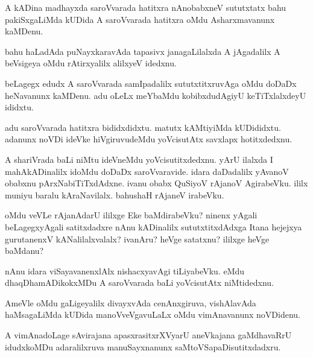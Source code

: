 \begin{mng}
A kADina madhayxda saroVvarada hatitxra nAnobabxneV sututxtatx bahu pakiSxgaLiMda kUDida A saroVvarada hatitxra oMdu Asharxmavanunx kaMDenu.
\end{mng}

\begin{mng}
bahu haLadAda puNayxkaravAda tapasivx janagaLilalxda A jAgadalilx A beVsigeya oMdu rAtirxyalilx alilxyeV idedxnu.
\end{mng}

\begin{mng}
beLagegx edudx A saroVvarada samIpadalilx sututxtitxruvAga oMdu doDaDx heNavanunx kaMDenu. adu oLeLx meYbaMdu kobibxdudAgiyU keTiTxlalxdeyU ididxtu.
\end{mng}

\begin{mng}
adu saroVvarada hatitxra bididxdidxtu. matutx kAMtiyiMda kUDididxtu. adanunx noVDi ideVke hiVgiruvudeMdu yoVcisutAtx savxlapx hotitxdedxnu.
\end{mng}

\begin{mng}
A shariVrada baLi niMtu ideVneMdu yoVcisutitxdedxnu. yArU ilalxda I mahAkADinalilx idoMdu doDaDx saroVvaravide. idara daDadalilx yAvanoV obabxnu pArxNabiTiTxdAdxne. ivanu obabx QuSiyoV rAjanoV AgirabeVku. ililx muniyu baralu kAraNavilalx. bahushaH rAjaneV irabeVku. 
\end{mng}

\begin{mng}
oMdu veVLe rAjanAdarU ililxge Eke baMdirabeVku? ninenx yAgali beLagegxyAgali satitxdadxre nAnu kADinalilx sututxtitxdAdxga Itana hejejxya gurutanenxV kANalilalxvalalx? ivanAru? heVge satatxnu? ililxge heVge baMdanu?
\end{mng}

\begin{mng}
nAnu idara viSayavanenxlAlx nishacxyavAgi tiLiyabeVku. eMdu dhaqDhamADikokxMDu A saroVvarada baLi yoVcisutAtx niMtidedxnu.
\end{mng}

\begin{mng}
AmeVle oMdu gaLigeyalilx divayxvAda cenAnxgiruva, vishAlavAda haMsagaLiMda kUDida manoVveVgavuLaLx oMdu vimAnavanunx noVDidenu.
\end{mng}

\begin{mng}
A vimAnadoLage sAvirajana apasxrasitxrXVyarU aneVkajana gaMdhavaRrU idudxkoMDu adaralilxruva manuSayxnanunx saMtoVSapaDisutitxdadxru.
\end{mng}

